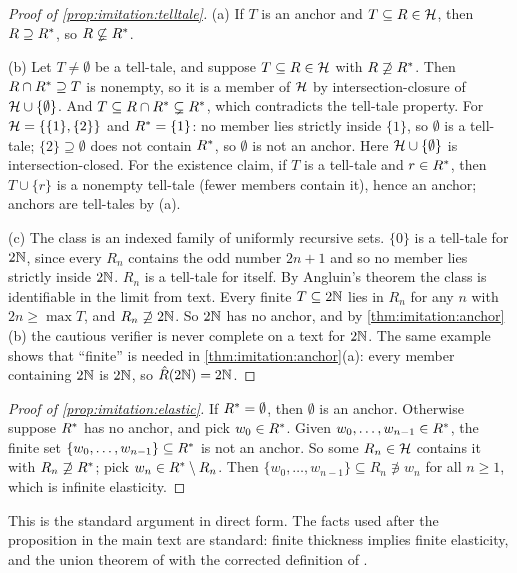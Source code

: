 \begin{proof}[Proof of \cref{prop:imitation:telltale}]
(a) If $T$ is an anchor and $T\subseteq R\in\mathcal{H}$, then $R\supseteq R^{*}$, so $R\not\subsetneq R^{*}$.

(b) Let $T\neq\emptyset$ be a tell-tale, and suppose $T\subseteq R\in\mathcal{H}$ with $R\not\supseteq R^{*}$. Then $R\cap R^{*}\supseteq T$ is nonempty, so it is a member of $\mathcal{H}$ by intersection-closure of $\mathcal{H}\cup\{\emptyset\}$. And $T\subseteq R\cap R^{*}\subsetneq R^{*}$, which contradicts the tell-tale property. For $\mathcal{H}=\{\{1\},\{2\}\}$ and $R^{*}=\{1\}$: no member lies strictly inside $\{1\}$, so $\emptyset$ is a tell-tale; $\{2\}\supseteq\emptyset$ does not contain $R^{*}$, so $\emptyset$ is not an anchor. Here $\mathcal{H}\cup\{\emptyset\}$ is intersection-closed. For the existence claim, if $T$ is a tell-tale and $r\in R^{*}$, then $T\cup\{r\}$ is a nonempty tell-tale (fewer members contain it), hence an anchor; anchors are tell-tales by (a).

(c) The class is an indexed family of uniformly recursive sets. $\{0\}$ is a tell-tale for $2\mathbb{N}$, since every $R_n$ contains the odd number $2n+1$ and so no member lies strictly inside $2\mathbb{N}$. $R_n$ is a tell-tale for itself. By Angluin's theorem \citep{angluin1980inductive} the class is identifiable in the limit from text. Every finite $T\subseteq2\mathbb{N}$ lies in $R_n$ for any $n$ with $2n\ge\max T$, and $R_n\not\supseteq2\mathbb{N}$. So $2\mathbb{N}$ has no anchor, and by \cref{thm:imitation:anchor}(b) the cautious verifier is never complete on a text for $2\mathbb{N}$. The same example shows that ``finite'' is needed in \cref{thm:imitation:anchor}(a): every member containing $2\mathbb{N}$ is $2\mathbb{N}$, so $\hat R(2\mathbb{N})=2\mathbb{N}$.
\end{proof}

\begin{proof}[Proof of \cref{prop:imitation:elastic}]
If $R^{*}=\emptyset$, then $\emptyset$ is an anchor. Otherwise suppose $R^{*}$ has no anchor, and pick $w_0\in R^{*}$. Given $w_0,\dots,w_{n-1}\in R^{*}$, the finite set $\{w_0,\dots,w_{n-1}\}\subseteq R^{*}$ is not an anchor. So some $R_n\in\mathcal{H}$ contains it with $R_n\not\supseteq R^{*}$; pick $w_n\in R^{*}\setminus R_n$. Then $\{w_0,\dots,w_{n-1}\}\subseteq R_n\not\ni w_n$ for all $n\ge1$, which is infinite elasticity.
\end{proof}

This is the standard argument in direct form. The facts used after the proposition in the main text are standard: finite thickness implies finite elasticity, and the union theorem of \citet{wright1989identification} with the corrected definition of \citet{motoki1991correct}.

